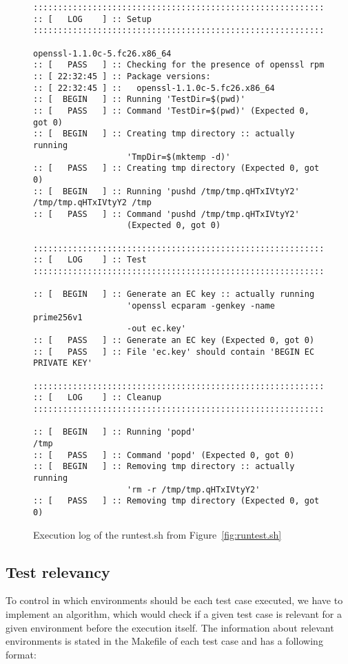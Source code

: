     \begin{figure}
        \begin{lstlisting}[basicstyle=\small]
:::::::::::::::::::::::::::::::::::::::::::::::::::::::::::::::
:: [   LOG    ] :: Setup
:::::::::::::::::::::::::::::::::::::::::::::::::::::::::::::::

openssl-1.1.0c-5.fc26.x86_64
:: [   PASS   ] :: Checking for the presence of openssl rpm
:: [ 22:32:45 ] :: Package versions:
:: [ 22:32:45 ] ::   openssl-1.1.0c-5.fc26.x86_64
:: [  BEGIN   ] :: Running 'TestDir=$(pwd)'
:: [   PASS   ] :: Command 'TestDir=$(pwd)' (Expected 0, got 0)
:: [  BEGIN   ] :: Creating tmp directory :: actually running
                   'TmpDir=$(mktemp -d)'
:: [   PASS   ] :: Creating tmp directory (Expected 0, got 0)
:: [  BEGIN   ] :: Running 'pushd /tmp/tmp.qHTxIVtyY2'
/tmp/tmp.qHTxIVtyY2 /tmp
:: [   PASS   ] :: Command 'pushd /tmp/tmp.qHTxIVtyY2'
                   (Expected 0, got 0)

:::::::::::::::::::::::::::::::::::::::::::::::::::::::::::::::
:: [   LOG    ] :: Test
:::::::::::::::::::::::::::::::::::::::::::::::::::::::::::::::

:: [  BEGIN   ] :: Generate an EC key :: actually running
                   'openssl ecparam -genkey -name prime256v1
                   -out ec.key'
:: [   PASS   ] :: Generate an EC key (Expected 0, got 0)
:: [   PASS   ] :: File 'ec.key' should contain 'BEGIN EC PRIVATE KEY'

:::::::::::::::::::::::::::::::::::::::::::::::::::::::::::::::
:: [   LOG    ] :: Cleanup
:::::::::::::::::::::::::::::::::::::::::::::::::::::::::::::::

:: [  BEGIN   ] :: Running 'popd'
/tmp
:: [   PASS   ] :: Command 'popd' (Expected 0, got 0)
:: [  BEGIN   ] :: Removing tmp directory :: actually running
                   'rm -r /tmp/tmp.qHTxIVtyY2'
:: [   PASS   ] :: Removing tmp directory (Expected 0, got 0)
        \end{lstlisting}
        \caption{Execution log of the runtest.sh from Figure~\ref{fig:runtest.sh}}
        \label{fig:runtest.sh-log}
    \end{figure}

\subsection{Test relevancy}
    To control in which environments should be each test case executed, we have
    to implement an algorithm, which would check if a given test case is relevant
    for a given environment before the execution itself. The information about
    relevant environments is stated in the Makefile of each test case and has
    a following format:

